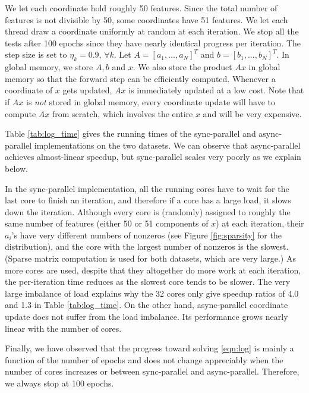 We let each coordinate hold roughly 50 features. {Since the total number of features is not divisible by 50, some coordinates have 51 features.} We let each thread draw a coordinate uniformly at random at each iteration. We stop all the tests after 100 epochs since they have nearly identical progress per iteration. %
The step size is set to $\eta_k=0.9,\,\forall k$. Let $A = [a_1, \ldots, a_N]^T$ and $b = [b_1, ..., b_N]^T$. In global memory, we store $A, b$ and $x$. We also store the product $Ax$ in global memory so that the forward step can be efficiently computed. Whenever a coordinate of $x$ gets updated, $Ax$ is immediately updated at a low cost. Note that if $Ax$ is \emph{not} stored in global memory, every coordinate update will have to compute $Ax$ from scratch, which involves the entire $x$ and will be very expensive.  %

Table \ref{tab:log_time} gives the running times of  the sync-parallel and async-parallel implementations on the two datasets. We can observe that async-parallel achieves almost-linear speedup, but sync-parallel scales very poorly as we explain below.

In the sync-parallel implementation,  all the running cores have to wait for the last core to finish an iteration, and therefore if a core has a large load, it slows down the iteration. Although every core is (randomly) assigned to roughly the same number of features (either 50 or 51 components of $x$) at each iteration, their  $a_i$'s have very different numbers of nonzeros (see Figure \ref{fig:sparsity} for the distribution), and the core with the largest number of nonzeros is the slowest. (Sparse matrix computation is used for both datasets, which are very large.) As more cores are used,  despite that they altogether do more work at each iteration,  the per-iteration time reduces as the slowest core tends to be slower. The very large imbalance of load explains why the 32 cores only give speedup ratios of 4.0 and 1.3 in Table \ref{tab:log_time}. On the other hand, async-parallel coordinate update does not suffer from the  load imbalance. Its performance grows nearly linear with the number of cores.

Finally, we have observed that the progress toward solving \eqref{eqn:log} is mainly a function of the number of epochs and does not change appreciably  when the number of cores increases or between sync-parallel and async-parallel. Therefore, we always stop at 100 epochs.


